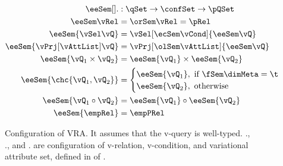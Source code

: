 \begin{figure}
\begin{alignat*}{1}
\eeSem [] . &: \qSet \to \confSet \to \pQSet\\
%
\eeSem \vRel &= \orSem \vRel = \pRel\\
\eeSem {\vSel \vQ}  &= \vSel [\ecSem \vCond] {\eeSem \vQ}\\
%
\eeSem {\vPrj [\vAttList] \vQ} &= \vPrj [\olSem \vAttList] {\eeSem \vQ}\\
%
%
\eeSem {{\vQ_1} \times {\vQ_2}} &= \eeSem {\vQ_1} \times \eeSem {\vQ_2}\\
%
%
\eeSem {\chc {\vQ_1, \vQ_2}} &= 
	\begin{cases}
		\eeSem {\vQ_1}, \text{ if } \fSem \dimMeta = \t\\
		\eeSem {\vQ_2}, \text{ otherwise}
	\end{cases}\\
%
\eeSem {{\vQ_1} \circ {\vQ_2}} &= \eeSem {\vQ_1} \circ \eeSem {\vQ_2}\\
%
\eeSem {\empRel} &= \empPRel
\end{alignat*}
\caption{Configuration of VRA. It assumes that the v-query
is well-typed. 
\orSem ., \ecSem ., and \olSem . are
configuration of v-relation, v-condition, and variational attribute
set, defined in  of .
}
\label{fig:v-alg-conf-sem}
\end{figure}
